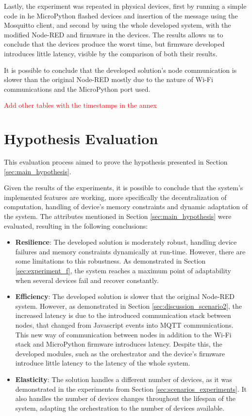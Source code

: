 Lastly, the experiment was repeated in physical devices, first by running a simple code in he MicroPython flashed devices and insertion of the message using the Mosquitto client, and second by using the whole developed system, with the modified Node-RED and firmware in the devices. The results allows us to conclude that the devices produce the worst time, but firmware developed introduces little latency, visible by the comparison of both their results.

It is possible to conclude that the developed solution's node communication is slower than the original Node-RED mostly due to the nature of Wi-Fi communications and the MicroPython port used.   

\textcolor{red}{Add other tables with the timestamps in the annex}

\section{Hypothesis Evaluation}\label{sec:evaluation_hypothesis}

This evaluation process aimed to prove the hypothesis presented in Section \ref{sec:main_hypothesis}.

Given the results of the experiments, it is possible to conclude that the system's implemented features are working, more specifically the decentralization of computation, handling of device's memory constraints and dynamic adaptation of the system. The attributes mentioned in Section \ref{sec:main_hypothesis} were evaluated, resulting in the following conclusions:

\begin{itemize}
    \item \textbf{Resilience}: The developed solution is moderately robust, handling device failures and memory constraints dynamically at run-time. However, there are some limitations to this robustness. As demonstrated in Section \ref{sec:experiment_f}, the system reaches a maximum point of adaptability when several devices fail and recover constantly.
    \item \textbf{Efficiency}: The developed solution is slower that the original Node-RED system. However, as demonstrated in Section \ref{sec:discussion_scenario2}, the increased latency is due to the introduced communication stack between nodes, that changed from Javascript events into MQTT communications. This new way of communication between nodes in addition to the Wi-Fi stack and MicroPython firmware introduces latency. Despite this, the developed modules, such as the orchestrator and the device's firmware introduce little latency to the latency of the whole system.
    \item \textbf{Elasticity}: The solution handles a different number of devices, as it was demonstrated in the experiments from Section \ref{sec:scenarios_experiments}. It also handles the number of devices changes throughout the lifespan of the system, adapting the orchestration to the number of devices available.
\end{itemize}

